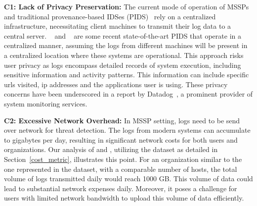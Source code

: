 \smallskip
\noindent
\textbf{C1: Lack of Privacy Preservation:} The current mode of operation of MSSPs and traditional provenance-based IDSes (PIDS)~\cite{flash2024,cheng2023kairos,wang2022threatrace} rely on a centralized infrastructure, necessitating client machines to transmit their log data to a central server. \flash~\cite{flash2024} and \kairos~\cite{cheng2023kairos} are some recent state-of-the-art PIDS that operate in a centralized manner, assuming the \logs logs from different machines will be present in a centralized location where these systems are operational. This approach risks user privacy as \logs logs encompass detailed records of system execution, including sensitive information and activity patterns. This information can include specific urls visited, ip addresses and the applications user is using. These privacy concerns have been underscored in a report by Datadog~\cite{datadog}, a prominent provider of system monitoring services.
    
\smallskip
\noindent
\textbf{C2: Excessive Network Overhead:} In MSSP setting, \logs logs need to be send over network for threat detection. The logs from modern systems can accumulate to gigabytes per day, resulting in significant network costs for both users and organizations. Our analysis of \flash and \kairos, utilizing the \optc dataset as detailed in Section~\ref{cost_metric}, illustrates this point. For an organization similar to the one represented in the \optc dataset, with a comparable number of hosts, the total volume of logs transmitted daily would reach 1000 GB. This volume of data could lead to substantial network expenses daily. Moreover, it poses a challenge for users with limited network bandwidth to upload this volume of data efficiently.
    

